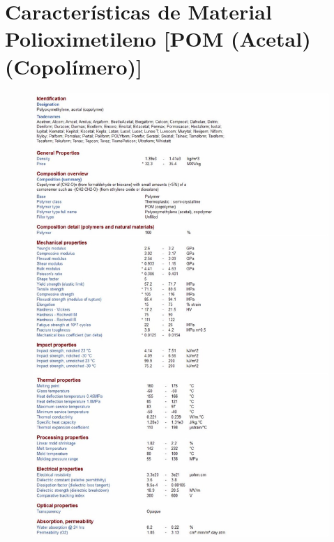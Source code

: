 \chapter{Caracter\'isticas de Material Polioximetileno [POM (Acetal)(Copol\'imero)]}

\newpage

\begin{figure}[H]
\centering
	\includegraphics[width=\textwidth, height=\textheight]{images/Anexos/POM1}
\end{figure}

\newpage

